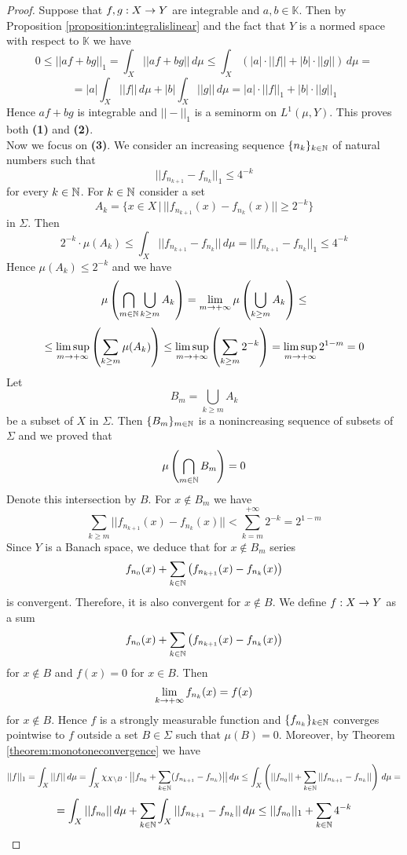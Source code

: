 \begin{proof}
Suppose that $f, g:X\rightarrow Y$ are integrable and $a, b\in \mathbb{K}$. Then by Proposition \ref{proposition:integralislinear} and the fact that $Y$ is a normed space with respect to $\mathbb{K}$ we have
$$0 \leq ||a f+ b g||_1 = \int_X||a f + b g||\,d\mu \leq \int_X\left(|a|\cdot ||f||+ |b|\cdot ||g||\right)\,d\mu= $$
$$= |a| \int_X||f||\,d\mu + |b| \int_X||g||\,d\mu = |a|\cdot ||f||_1+ |b|\cdot ||g||_1 $$
Hence $a f + b g$ is integrable and $||-||_1$ is a seminorm on $L^1(\mu,Y)$. This proves both \textbf{(1)} and \textbf{(2)}.\\
Now we focus on \textbf{(3)}. We consider an increasing sequence $\{n_k\}_{k\in {\mathbb N}}$ of natural numbers such that
$$||f_{n_{k+1}} - f_{n_k}||_1\leq 4^{-k}$$
for every $k\in {\mathbb N}$. For $k\in {\mathbb N}$ consider a set
$$A_k = \big\{x\in X\,\big|\,||f_{n_{k+1}}(x) - f_{n_k}(x)||\geq 2^{-k}\big\}$$
in $\Sigma$. Then
$$2^{-k}\cdot \mu(A_k)\leq \int_X||f_{n_{k+1}}-f_{n_k}||\,d\mu = ||f_{n_{k+1}}-f_{n_k}||_1\leq 4^{-k}$$
Hence $\mu(A_k)\leq 2^{-k}$ and we have
$$\mu\left(\bigcap_{m\in {\mathbb N}}\bigcup_{k\geq m}A_k\right) = \lim_{m\rightarrow +\infty} \mu\left(\bigcup_{k\geq m}A_k\right)\leq $$
$$\leq \limsup_{m\rightarrow +\infty}\left(\sum_{k\geq m}\mu(A_k)\right) \leq \limsup_{m\rightarrow +\infty}\left(\sum_{k\geq m}2^{-k}\right) = \limsup_{m\rightarrow +\infty} 2^{1-m} = 0$$
Let
$$B_m = \bigcup_{k\geq m}A_k$$
be a subset of $X$ in $\Sigma$. Then $\{B_m\}_{m\in {\mathbb N}}$ is a nonincreasing sequence of subsets of $\Sigma$ and we proved that
$$\mu\left(\bigcap_{m\in {\mathbb N}}B_m\right)=  0$$
Denote this intersection by $B$. For $x\not \in B_m$ we have
$$\sum_{k\geq m}||f_{n_{k+1}}(x) - f_{n_k}(x)|| < \sum_{k=m}^{+\infty}2^{-k} = 2^{1-m}$$
Since $Y$ is a Banach space, we deduce that for $x\not \in B_m$ series
$$f_{n_0}(x) + \sum_{k\in {\mathbb N}}\left(f_{n_{k+1}}(x) - f_{n_k}(x)\right)$$
is convergent. Therefore, it is also convergent for $x\not \in B$. We define $f:X\rightarrow Y$ as a sum
$$f_{n_0}(x) + \sum_{k\in {\mathbb N}}\left(f_{n_{k+1}}(x) - f_{n_k}(x)\right)$$
for $x\not \in B$ and $f(x) = 0$ for $x\in B$. Then
$$\lim_{k\rightarrow +\infty}f_{n_k}(x) = f(x)$$
for $x \not \in B$. Hence $f$ is a strongly measurable function and $\{f_{n_k}\}_{k\in {\mathbb N}}$ converges pointwise to $f$ outside a set $B\in \Sigma$ such that $\mu(B) = 0$. Moreover, by Theorem \ref{theorem:monotoneconvergence} we have
$$||f||_1 = \int_X||f||\,d\mu = \int_X\chi_{X\setminus B}\cdot \big|\big|f_{n_0} + \sum_{k\in {\mathbb N}}(f_{n_{k+1}} - f_{n_k})\big|\big|\,d\mu \leq \int_X\left(||f_{n_0}|| + \sum_{k\in {\mathbb N}}||f_{n_{k+1}}-f_{n_k}||\right)\,d\mu = $$
$$= \int_X||f_{n_0}||\,d\mu + \sum_{k\in {\mathbb N}}\int_X||f_{n_{k+1}}-f_{n_k}||\,d\mu \leq ||f_{n_0}||_1 + \sum_{k\in {\mathbb N}}4^{-k} $$

\end{proof}
